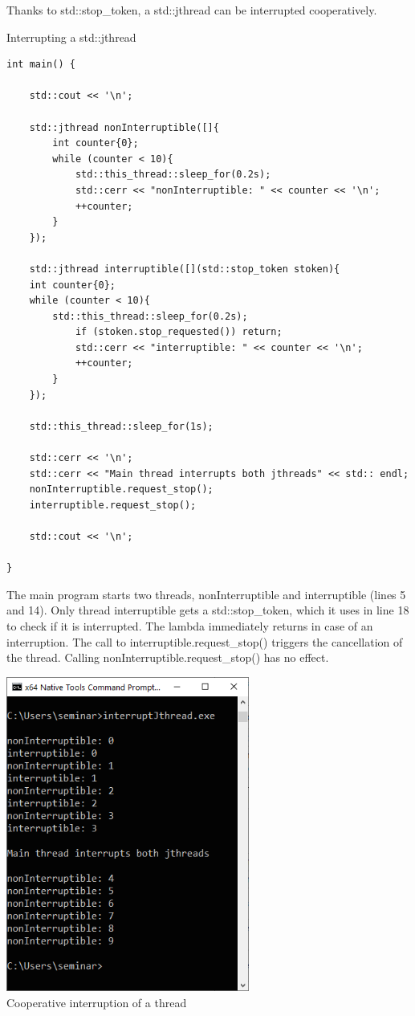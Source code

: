 
Thanks to std::stop\_token, a std::jthread can be interrupted cooperatively.

\noindent
Interrupting a std::jthread
\begin{lstlisting}[style=styleCXX]
int main() {
	
	std::cout << '\n';
	
	std::jthread nonInterruptible([]{
		int counter{0};
		while (counter < 10){
			std::this_thread::sleep_for(0.2s);
			std::cerr << "nonInterruptible: " << counter << '\n';
			++counter;
		}
	});
	
	std::jthread interruptible([](std::stop_token stoken){
	int counter{0};
	while (counter < 10){
		std::this_thread::sleep_for(0.2s);
			if (stoken.stop_requested()) return;
			std::cerr << "interruptible: " << counter << '\n';
			++counter;
		}
	});
	
	std::this_thread::sleep_for(1s);
	
	std::cerr << '\n';
	std::cerr << "Main thread interrupts both jthreads" << std:: endl;
	nonInterruptible.request_stop();
	interruptible.request_stop();
	
	std::cout << '\n';
	
}
\end{lstlisting}

The main program starts two threads, nonInterruptible and interruptible (lines 5 and 14). Only thread interruptible gets a std::stop\_token, which it uses in line 18 to check if it is interrupted. The lambda immediately returns in case of an interruption. The call to interruptible.request\_stop() triggers the cancellation of the thread. Calling nonInterruptible.request\_stop() has no effect.

\begin{center}
\includegraphics[width=0.6\textwidth]{content/2/chapter3/images/8.png}\\
Cooperative interruption of a thread
\end{center}

